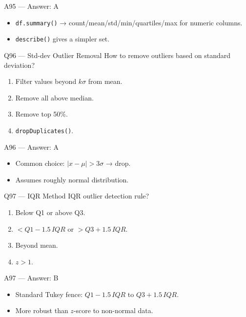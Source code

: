 \documentclass[aspectratio=169,10pt]{beamer}
\begin{document}
	\begin{frame}{A95 — Answer: A}
		\begin{itemize}
			\item \texttt{df.summary()} → count/mean/std/min/quartiles/max for numeric columns.
			\item \texttt{describe()} gives a simpler set.
		\end{itemize}
	\end{frame}
	
	\begin{frame}{Q96 — Std-dev Outlier Removal}
		How to remove outliers based on standard deviation?
		\begin{enumerate}[label=\Alph*.]
			\item Filter values beyond $k\sigma$ from mean.
			\item Remove all above median.
			\item Remove top 50\%.
			\item \texttt{dropDuplicates()}.
		\end{enumerate}
	\end{frame}
	
	\begin{frame}{A96 — Answer: A}
		\begin{itemize}
			\item Common choice: $|x - \mu| > 3\sigma$ → drop.
			\item Assumes roughly normal distribution.
		\end{itemize}
	\end{frame}
	
	\begin{frame}{Q97 — IQR Method}
		IQR outlier detection rule?
		\begin{enumerate}[label=\Alph*.]
			\item Below Q1 or above Q3.
			\item $< Q1 - 1.5\,IQR$ or $> Q3 + 1.5\,IQR$.
			\item Beyond mean.
			\item $z > 1$.
		\end{enumerate}
	\end{frame}
	
	\begin{frame}{A97 — Answer: B}
		\begin{itemize}
			\item Standard Tukey fence: $Q1 - 1.5\,IQR$ to $Q3 + 1.5\,IQR$.
			\item More robust than $z$-score to non-normal data.
		\end{itemize}
	\end{frame}
	
\end{document}
